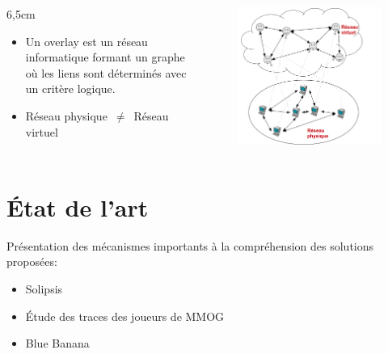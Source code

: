 \documentclass{beamer}
\begin{document}
  \begin{frame}
	
 	\begin{columns}
          \begin{column}{6,5cm}
	    	\begin{itemize}
		\item Un overlay est un réseau informatique formant un graphe où les liens sont déterminés avec un critère logique.\\
		\item Réseau physique~$\neq$~Réseau virtuel
		\end{itemize}
	  \end{column}
          \begin{column}{5cm}
        	\begin{figure}
        	  \includegraphics[scale=0.2]{./Ressources/Images/overlay.png}\\
        	  \label{Propa_Algo}
        	\end{figure}
          \end{column}
        \end{columns}
	
  \end{frame}
	
  \section{État de l'art}
  \begin{frame}
	Présentation des  mécanismes importants à la compréhension des solutions proposées:\\
	\begin{itemize}
		\item Solipsis\\
		\item Étude des traces des joueurs de MMOG\\
		\item Blue Banana \\
	\end{itemize}
  \end{frame}
\end{document}
